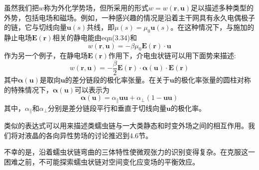 虽然我们把$w$称为外化学势场，但所采用的形式$w=w(\mathbf{r},\mathbf{u})$足以描述多种类型的外势，包括电场和磁场。例如，一种感兴趣的情况是沿着主干网具有永久电偶极子的链，它与切线向量$\mathbf{u}(s)$共线，即$\mu(s)=\mu_0\mathbf{u}(s)$。在这种情况下，与施加的静止电场$\mathbf{E}(\mathbf{r})$相关的静电能由eqn(3.34)和
\begin{equation}
w(\mathbf{r},\mathbf{u})=-\beta\mu_0\mathbf{E}(\mathbf{r})\cdot\mathbf{u}
\end{equation}
作为另一个例子，在静电场$\mathbf{E}(\mathbf{r})$作用下，介电虫状链可以用下面势来描述:
\begin{equation}
w(\mathbf{r},\mathbf{u})=-\frac{\beta}{2}\mathbf{E}(\mathbf{r})\cdot\boldsymbol{\alpha}(\mathbf{u})\cdot\mathbf{E}(\mathbf{r})
\end{equation}
其中$\boldsymbol{\alpha}(\mathbf{u})$是取向$\mathbf{u}$的差分链段的极化率张量。在关于$\mathbf{u}$的极化率张量的圆柱对称的特殊情况下，$\boldsymbol{\alpha}(\mathbf{u})$可以表示为
\begin{equation}
\boldsymbol{\alpha}(\mathbf{u})=\alpha_{\parallel}\mathbf{u}\mathbf{u}+\alpha_{\perp}(1-\mathbf{u}\mathbf{u})
\end{equation}
其中，$\alpha_{\parallel}$和$\alpha_{\perp}$分别是差分链段平行和垂直于切线向量$\mathbf{u}$的极化率。

类似的表达式可以用来描述类蠕虫链与一大类静态和时变外场之间的相互作用。我们将对液晶的各向异性势场的讨论推迟到4.6节。

不幸的是，沿着蠕虫状链弯曲的三体特性使微观张力的识别变得复杂。在克服这一困难之前，不可能探索蠕虫状链对空间变化应变场的平衡效应。
